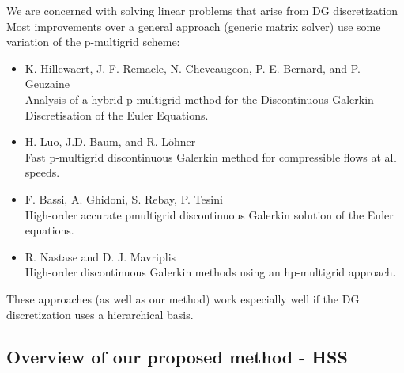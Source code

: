 \documentclass[mathserif]{beamer}
\begin{document}
\begin{frame}

We are concerned with solving linear problems that arise from DG discretization\ \\
Most improvements over a general approach (generic matrix solver) use some variation of the p-multigrid scheme:

\begin{itemize}
\item \vspace{-2mm} K. Hillewaert, J.-F. Remacle, N. Cheveaugeon, P.-E. Bernard, and P. Geuzaine\\
 \vspace{-2.5mm} Analysis of a hybrid p-multigrid method for the Discontinuous Galerkin Discretisation of the Euler Equations.

\item \vspace{-2mm} H. Luo, J.D. Baum, and R. L\"ohner\\
\vspace{-2.5mm} Fast p-multigrid discontinuous Galerkin method for compressible flows at all speeds.

\item \vspace{-2mm} F. Bassi, A. Ghidoni, S. Rebay, P. Tesini\\
\vspace{-2.5mm} High-order accurate pmultigrid discontinuous Galerkin solution of the Euler equations.

\item \vspace{-2mm} R. Nastase and D. J. Mavriplis\\
\vspace{-2.5mm} High-order discontinuous Galerkin methods using an hp-multigrid approach.

\end{itemize}

These approaches (as well as our method) work especially well if the DG discretization uses a hierarchical basis.
\end{frame}


\subsection{Overview of our proposed method - HSS}
\end{document}
